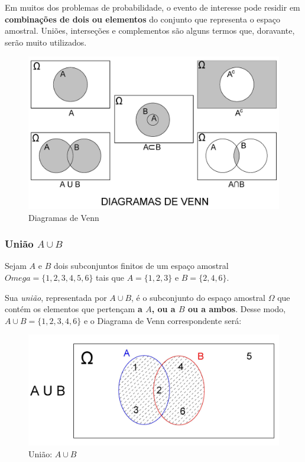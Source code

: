 \documentclass[
]{book}
\begin{document}
Em muitos dos problemas de probabilidade, o evento de interesse pode residir em \textbf{combinações de dois ou elementos} do conjunto que representa o espaço amostral. Uniões, interseções e complementos são alguns termos que, doravante, serão muito utilizados.

\hfill\break

\begin{figure}

{\centering \includegraphics[width=0.8\linewidth]{images4/venn} 

}

\caption{Diagramas de Venn}\label{fig:unnamed-chunk-55}
\end{figure}

\hfill\break

\hypertarget{uniuxe3o-a-cup-b}{%
\subsubsection{\texorpdfstring{União \(A \cup B\)}{União A \textbackslash cup B}}\label{uniuxe3o-a-cup-b}}

Sejam \(A\) e \(B\) dois subconjuntos finitos de um espaço amostral \(Omega=\{1,2,3,4,5,6\}\) tais que \(A=\{1,2,3\}\) e \(B=\{2,4,6\}\).

\hfill\break

Sua \emph{união}, representada por \(A \cup B\), é o subconjunto do espaço amostral \(\Omega\) que contém os elementos que pertençam \textbf{a \(A\), ou a \(B\) ou a ambos}. Desse modo, \(A \cup B =\{1,2,3,4,6\}\) e o Diagrama de Venn correspondente será:

\hfill\break

\begin{figure}

{\centering \includegraphics[width=0.8\linewidth]{images4/A_UN_B} 

}

\caption{União: $A \cup B$}\label{fig:unnamed-chunk-56}
\end{figure}
\end{document}
